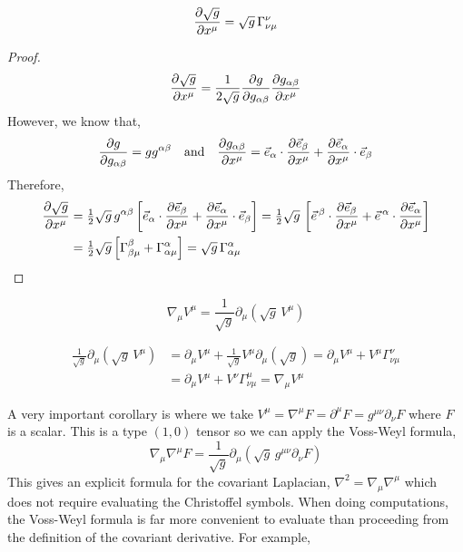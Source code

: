 \documentclass[11pt, a4paper]{article}
\begin{document}
\begin{lemma}
\[ \frac{\partial{\sqrt{g}}}{\partial{x^{\mu}}} = \sqrt{g} \, \Gamma^{\nu}_{\nu \mu}\]
\end{lemma}

\begin{proof}
\[ \frac{\partial{\sqrt{g}}}{\partial{x^\mu}} = \frac{1}{2 \sqrt{g}} \frac{\partial{g}}{\partial{g_{\alpha \beta}}} \frac{\partial{g_{\alpha \beta}}}{\partial{x^{\mu}}}\]
However, we know that,
\[ \frac{\partial{g}}{\partial{g_{\alpha \beta}}} = g g^{\alpha \beta} \quad \text{and} \quad \frac{\partial{g_{\alpha \beta}}}{\partial{x^\mu}} = \vec{e}_{\alpha} \cdot \frac{\partial{\vec{e}_{\beta}}}{\partial{x^\mu}} + \frac{\partial{\vec{e}_{\alpha}}}{\partial{x^{\mu}}} \cdot \vec{e}_{\beta}  \]
Therefore,
\begin{align*}
 \frac{\partial{\sqrt{g}}}{\partial{x^\mu}} & = \tfrac{1}{2} \sqrt{g} \, g^{\alpha \beta} \left[ \vec{e}_{\alpha} \cdot \frac{\partial{\vec{e}_{\beta}}}{\partial{x^\mu}} + \frac{\partial{\vec{e}_{\alpha}}}{\partial{x^{\mu}}} \cdot \vec{e}_{\beta} \right] = \tfrac{1}{2} \sqrt{g} \,  \left[  \vec{e}^{\, \beta} \cdot \frac{\partial{\vec{e}_{\beta}}}{\partial{x^\mu}} + \vec{e}^{\, \alpha} \cdot \frac{\partial{\vec{e}_{\alpha}}}{\partial{x^{\mu}}}  \right] 
\\
 & = \tfrac{1}{2} \sqrt{g} \left[ \Gamma^\beta_{\beta \mu} + \Gamma^{\alpha}_{\alpha \mu} \right] = \sqrt{g} \, \Gamma^{\alpha}_{\alpha \mu}
\end{align*}
\end{proof}

\begin{theorem}
\[ \nabla_\mu V^\mu = \frac{1}{\sqrt{g}} \partial_\mu \left( \sqrt{g} \, V^\mu \right) \]
\end{theorem}

\begin{theorem}
\begin{align*}
\frac{1}{\sqrt{g}} \partial_\mu \left( \sqrt{g} \, V^\mu \right) & = \partial_\mu V^\mu + \frac{1}{\sqrt{g}} V^\mu \partial_\mu (\sqrt{g})  = \partial_\mu V^\mu + V^\mu \Gamma^{\nu}_{\nu \mu} 
\\
& = \partial_\mu V^\mu + V^\nu \Gamma^{\mu}_{\nu \mu} = \nabla_{\mu} V^{\mu} 
\end{align*}
\end{theorem}
\noindent
A very important corollary is where we take $V^\mu = \nabla^{\mu} F = \partial^\mu F = g^{\mu \nu} \partial_{\nu} F$ where $F$ is a scalar. This is a type $(1,0)$ tensor so we can apply the Voss-Weyl formula,
\[ \nabla_\mu \nabla^\mu F = \frac{1}{\sqrt{g}} \partial_\mu ( \sqrt{g} \, g^{\mu \nu} \partial_\nu F ) \]
This gives an explicit formula for the covariant Laplacian, $\nabla^2 = \nabla_\mu \nabla^\mu$ which does not require evaluating the Christoffel symbols. When doing computations, the Voss-Weyl formula is far more convenient to evaluate than proceeding from the definition of the covariant derivative. For example,
\end{document}
